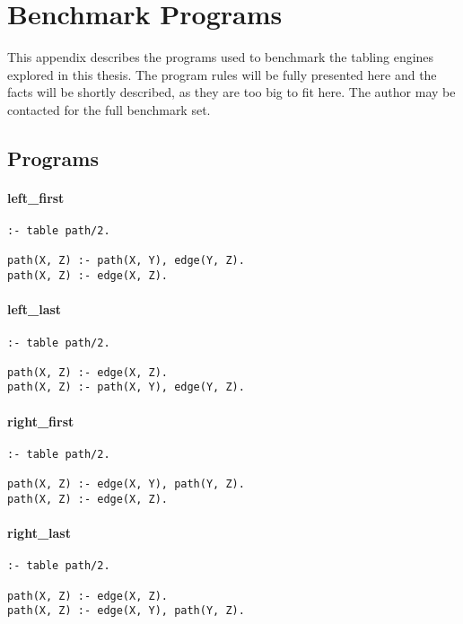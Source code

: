 \chapter{Benchmark Programs}\label{app:code}

This appendix describes the programs used to benchmark the tabling engines
explored in this thesis. The program rules will be fully presented here and
the facts will be shortly described, as they are too big to fit here.
The author may be contacted for the full benchmark set.

\section{Programs}

\subsubsection*{left\_first}

\begin{Verbatim}
:- table path/2.

path(X, Z) :- path(X, Y), edge(Y, Z).
path(X, Z) :- edge(X, Z).
\end{Verbatim}

\subsubsection*{left\_last}

\begin{Verbatim}
:- table path/2.

path(X, Z) :- edge(X, Z).
path(X, Z) :- path(X, Y), edge(Y, Z).
\end{Verbatim}

\subsubsection*{right\_first}

\begin{Verbatim}
:- table path/2.

path(X, Z) :- edge(X, Y), path(Y, Z).
path(X, Z) :- edge(X, Z).
\end{Verbatim}

\subsubsection*{right\_last}

\begin{Verbatim}
:- table path/2.

path(X, Z) :- edge(X, Z).
path(X, Z) :- edge(X, Y), path(Y, Z).
\end{Verbatim}

